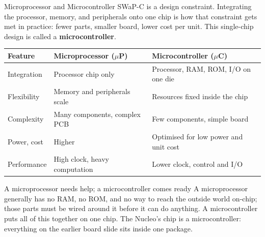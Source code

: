 \documentclass[9pt,aspectratio=169,xcolor=table]{beamer}
\begin{document}
\begin{frame}{Microprocessor and Microcontroller}
	\leavevmode
	{\small SWaP-C is a design constraint. Integrating the processor,
		memory, and peripherals onto \alert{one chip} is how that
		constraint gets met in practice: fewer parts, smaller board,
		lower cost per unit. This single-chip design is called a
		\textbf{microcontroller}.}

	\vspace{2mm}
	\begin{center}
		{\small
			\striped
			\begin{tabular}{@{}l l l@{}}
				\toprule
				\textbf{Feature} & \textbf{Microprocessor ($\mu$P)} & \textbf{Microcontroller ($\mu$C)} \\
				\midrule
				Integration  & Processor chip only & Processor, RAM, ROM, I/O on one die \\
				Flexibility  & Memory and peripherals scale & Resources fixed inside the chip \\
				Complexity   & Many components, complex PCB & Few components, simple board \\
				Power, cost  & Higher & Optimised for low power and unit cost \\
				Performance  & High clock, heavy computation & Lower clock, control and I/O \\
				\bottomrule
		\end{tabular}}
	\end{center}

	\vspace{3mm}
	\begin{block}{A microprocessor needs help; a microcontroller comes ready}
		A microprocessor generally has no RAM, no ROM, and no way to
		reach the outside world on-chip; those parts must be wired
		around it before it can do anything. A microcontroller puts
		all of this together on one chip. \alert{The Nucleo's chip is
			a microcontroller}: everything on the earlier board slide
		sits inside one package.
	\end{block}

\end{frame}
\end{document}

